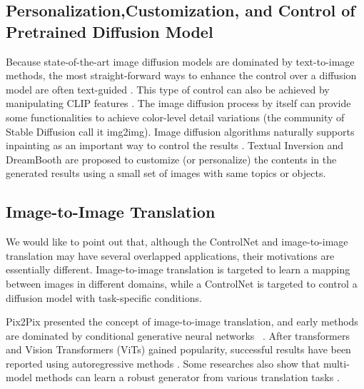 \documentclass{article}
\begin{document}
\subsection{Personalization,Customization, and Control of Pretrained Diffusion Model}

Because state-of-the-art image diffusion models are dominated by text-to-image methods, the most straight-forward ways to enhance the control over a diffusion model are often text-guided \cite{nichol2021glide,kim2022diffusionclip,avrahami2022blended, 2211.09800, kawar2022imagic,ramesh2022hierarchical,hertz2022prompt}. This type of control can also be achieved by manipulating CLIP features \cite{ramesh2022hierarchical}. The image diffusion process by itself can provide some functionalities to achieve color-level detail variations \cite{meng2021sdedit} (the community of Stable Diffusion call it img2img). Image diffusion algorithms naturally supports inpainting as an important way to control the results \cite{ramesh2022hierarchical,avrahami2022blended}. Textual Inversion \cite{gal2022image} and DreamBooth \cite{ruiz2022dreambooth} are proposed to customize (or personalize) the contents in the generated results using a small set of images with same topics or objects.

\subsection{Image-to-Image Translation}

We would like to point out that, although the ControlNet and image-to-image translation may have several overlapped applications, their motivations are essentially different. Image-to-image translation is targeted to learn a mapping between images in different domains, while a ControlNet is targeted to control a diffusion model with task-specific conditions.

Pix2Pix \cite{isola2017image} presented the concept of image-to-image translation, and early methods are dominated by conditional generative neural networks ~\cite{isola2017image,zhu2017toward,wang2018high,park2019semantic,choi2018stargan,zhang2020cross,zhou2021cocosnet}. After transformers and Vision Transformers (ViTs) gained popularity, successful results have been reported using autoregressive methods \cite{ramesh2021zero,DBLP:journals/corr/abs-2012-09841, chen2021pre}. Some researches also show that multi-model methods can learn a robust generator from various translation tasks \cite{zhang2021m6,kutuzova2021multimodal,huang2021multimodal,qian2019trinity}.
\end{document}
